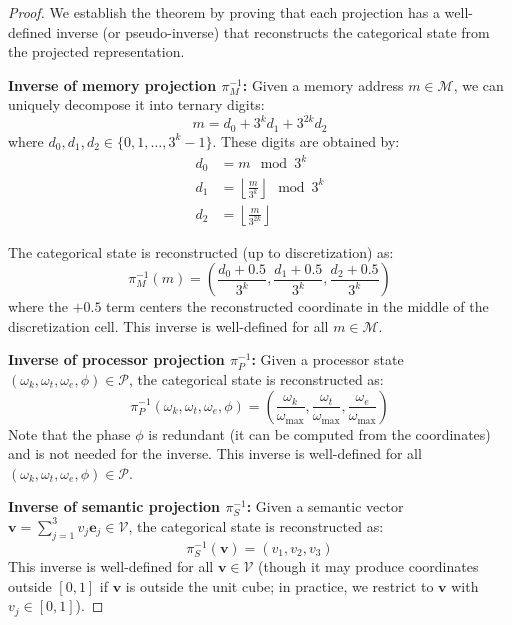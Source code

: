 \begin{proof}
We establish the theorem by proving that each projection has a well-defined inverse (or pseudo-inverse) that reconstructs the categorical state from the projected representation.

\textbf{Inverse of memory projection $\pi_M^{-1}$:} Given a memory address $m \in \mathcal{M}$, we can uniquely decompose it into ternary digits:
\begin{equation}
m = d_0 + 3^k d_1 + 3^{2k} d_2
\end{equation}
where $d_0, d_1, d_2 \in \{0, 1, \ldots, 3^k - 1\}$. These digits are obtained by:
\begin{align}
d_0 &= m \mod 3^k \\
d_1 &= \left\lfloor \frac{m}{3^k} \right\rfloor \mod 3^k \\
d_2 &= \left\lfloor \frac{m}{3^{2k}} \right\rfloor
\end{align}

The categorical state is reconstructed (up to discretization) as:
\begin{equation}
\pi_M^{-1}(m) = \left( \frac{d_0 + 0.5}{3^k}, \frac{d_1 + 0.5}{3^k}, \frac{d_2 + 0.5}{3^k} \right)
\label{eq:pi_M_inverse}
\end{equation}
where the $+0.5$ term centers the reconstructed coordinate in the middle of the discretization cell. This inverse is well-defined for all $m \in \mathcal{M}$.

\textbf{Inverse of processor projection $\pi_P^{-1}$:} Given a processor state $(\omega_k, \omega_t, \omega_e, \phi) \in \mathcal{P}$, the categorical state is reconstructed as:
\begin{equation}
\pi_P^{-1}(\omega_k, \omega_t, \omega_e, \phi) = \left( \frac{\omega_k}{\omega_{\max}}, \frac{\omega_t}{\omega_{\max}}, \frac{\omega_e}{\omega_{\max}} \right)
\label{eq:pi_P_inverse}
\end{equation}
Note that the phase $\phi$ is redundant (it can be computed from the coordinates) and is not needed for the inverse. This inverse is well-defined for all $(\omega_k, \omega_t, \omega_e, \phi) \in \mathcal{P}$.

\textbf{Inverse of semantic projection $\pi_S^{-1}$:} Given a semantic vector $\mathbf{v} = \sum_{j=1}^3 v_j \mathbf{e}_j \in \mathcal{V}$, the categorical state is reconstructed as:
\begin{equation}
\pi_S^{-1}(\mathbf{v}) = (v_1, v_2, v_3)
\label{eq:pi_S_inverse}
\end{equation}
This inverse is well-defined for all $\mathbf{v} \in \mathcal{V}$ (though it may produce coordinates outside $[0,1]$ if $\mathbf{v}$ is outside the unit cube; in practice, we restrict to $\mathbf{v}$ with $v_j \in [0,1]$).


\end{proof}
